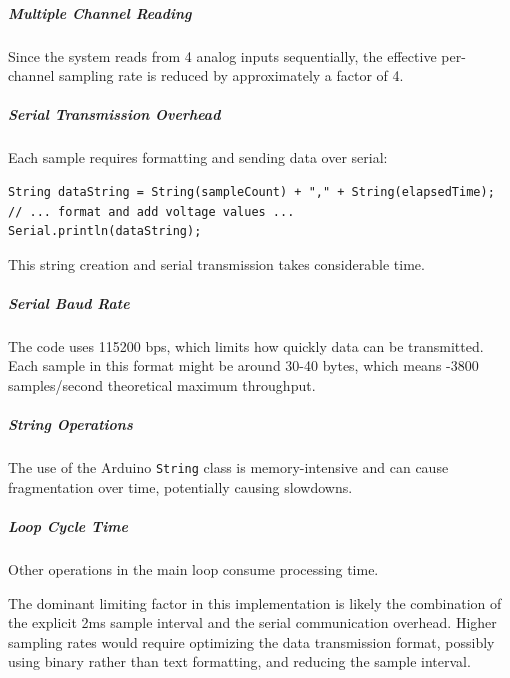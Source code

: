 \subparagraph{Multiple Channel Reading}
Since the system reads from 4 analog inputs sequentially, the effective per-channel sampling rate is reduced by approximately a factor of 4.

\subparagraph{Serial Transmission Overhead}
Each sample requires formatting and sending data over serial:
\begin{verbatim}
String dataString = String(sampleCount) + "," + String(elapsedTime);
// ... format and add voltage values ...
Serial.println(dataString);
\end{verbatim}
This string creation and serial transmission takes considerable time.

\subparagraph{Serial Baud Rate}
The code uses 115200 bps, which limits how quickly data can be transmitted. Each sample in this format might be around 30-40 bytes, which means -3800 samples/second theoretical maximum throughput.

\subparagraph{String Operations}
The use of the Arduino \texttt{String} class is memory-intensive and can cause fragmentation over time, potentially causing slowdowns.

\subparagraph{Loop Cycle Time}
Other operations in the main loop consume processing time.

The dominant limiting factor in this implementation is likely the combination of the explicit 2ms sample interval and the serial communication overhead. Higher sampling rates would require optimizing the data transmission format, possibly using binary rather than text formatting, and reducing the sample interval.

